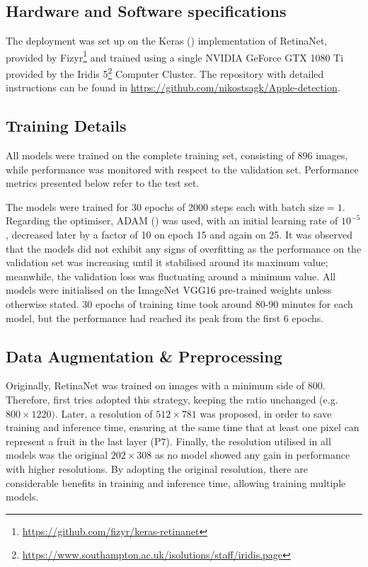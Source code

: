 \subsection{Hardware and Software specifications}
The deployment was set up on the Keras (\cite{chollet2015keras}) implementation of RetinaNet, provided by Fizyr\footnote{\url{https://github.com/fizyr/keras-retinanet}} and trained using a single NVIDIA GeForce GTX 1080 Ti provided by the Iridis 5\footnote{\url{https://www.southampton.ac.uk/isolutions/staff/iridis.page}} Computer Cluster. The repository with detailed instructions can be found in \url{https://github.com/nikostsagk/Apple-detection}.

\subsection{Training Details}\label{training_details}
All models were trained on the complete training set, consisting of 896 images, while performance was monitored with respect to the validation set. Performance metrics presented below refer to the test set.

The models were trained for 30 epochs of 2000 steps each with $\text{batch size} = 1$. Regarding the optimiser, ADAM (\cite{kingma2014adam}) was used, with an initial learning rate of $10^{-5}$, decreased later by a factor of 10 on epoch 15 and again on 25. It was observed that the models did not exhibit any signs of overfitting as the performance on the validation set was increasing until it stabilised around its maximum value; meanwhile, the validation loss was fluctuating around a minimum value. All models were initialised on the ImageNet VGG16 pre-trained weights unless otherwise stated. 30 epochs of training time took around 80-90 minutes for each model, but the performance had reached its peak from the first 6 epochs.

\subsection{Data Augmentation \& Preprocessing}
Originally, RetinaNet was trained on images with a minimum side of 800. Therefore, first tries adopted this strategy, keeping the ratio unchanged (e.g. $800\times1220)$. Later, a resolution of $512\times781$ was proposed, in order to save training and inference time, ensuring at the same time that at least one pixel can represent a fruit in the last layer (P7). Finally, the resolution utilised in all models was the original $202\times308$ as no model showed any gain in performance with higher resolutions. By adopting the original resolution, there are considerable benefits in training and inference time, allowing training multiple models.

